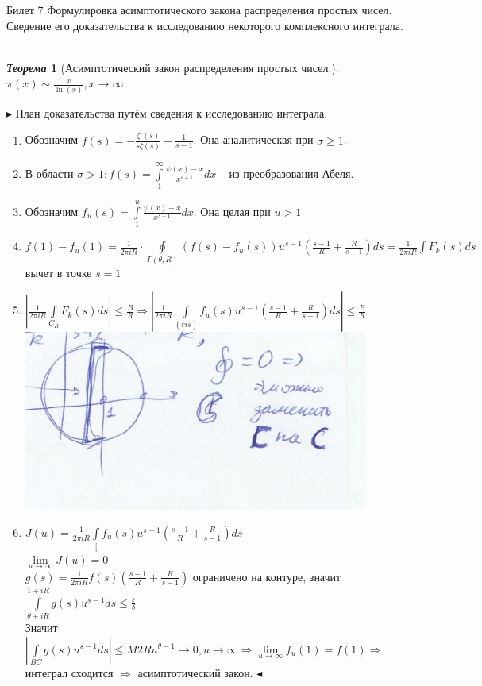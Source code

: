 \documentclass[a4paper,12pt]{article}
\newtheorem{teo}{\textit{Теорема}}
\newcommand{\TE}{\theta}
\newcommand{\SI}{\psi}
\newcommand{\q}{\quad}
\newcommand{\pb}{\blacktriangleright}
\newcommand{\pe}{\blacktriangleleft}
\newcommand{\Ra}{\Rightarrow}
\newcommand{\IL}{\int\limits}
\newcommand{\os}{\left(}
\newcommand{\cs}{\right)}
\begin{document}
\newpage
\begin{mybox}{\hypertarget{bil7}{Билет 7}}
Формулировка асимптотического закона распределения простых чисел. Сведение его доказательства к исследованию некоторого комплексного интеграла.\\\q\\
\begin{teo}[Асимптотический закон распределения простых чисел.]\q\\
$\pi(x)\sim \frac{x}{\ln(x)}, x\to\infty$
\end{teo}
$\pb$
План доказательства путём сведения к исследованию интеграла.
\begin{enumerate}
    \item Обозначим $f(s) = -\frac{\zeta'(s)}{s\zeta(s)} - \frac{1}{s-1}$. Она аналитическая при $\sigma \ge 1$.
    \item В области $\sigma > 1: f(s) =\IL_1^\infty\frac{\SI(x) - x}{x^{s+1}}dx $ -- из преобразования Абеля.
\item Обозначим $f_u(s) = \IL_1^u\frac{\SI(x) - x}{x^{s+1}}dx$. Она целая при $u > 1$
\item $f(1) - f_u(1) = \frac{1}{2\pi i R} \cdot \oint\limits_{\Gamma(\TE, R)} (f(s) - f_u(s))u^{s-1}\os \frac{s-1}{R} + \frac{R} {s-1} \cs ds = \frac{1}{2\pi i R}\int F_k(s)ds $ вычет в точке $s=1$
\item $\left| \frac{1}{2\pi i R} \IL_{C_R}F_k(s)ds \right| \le \frac{B}{R}  \Ra \left| \frac{1}{2\pi i R} \IL_{(ris)} f_u(s) u^{s-1} \os \frac{s-1}{R} + \frac{R}{s-1}  \cs  ds \right| \le \frac{B}{R} $
\includegraphics{p1.png}\q\\
\item $J(u) =  \frac{1}{2\pi i R} \IL_{[} f_u(s) u^{s-1} \os \frac{s-1}{R} + \frac{R}{s-1}  \cs ds $\\
$\lim\limits_{u\to\infty} J(u) = 0$\\
$g(s) = \frac{1}{2\pi i R}f(s)\os \frac{s-1}{R} + \frac{R}{s-1}    \cs $ ограничено на контуре, значит $\IL_{\TE+iR}^{1+iR}g(s) u^{s-1}ds \le \frac{\varepsilon}{\delta} $\\
Значит $|\IL_{BC} g(s)u^{s-1}ds |\le M2Ru^{\TE-1}\to0, u\to\infty\Ra \lim\limits_{u\to\infty}f_u(1) = f(1)\Ra $ интеграл сходится $\Ra$ асимптотический закон. $\pe$
\end{enumerate}
\end{mybox}
\end{document}
